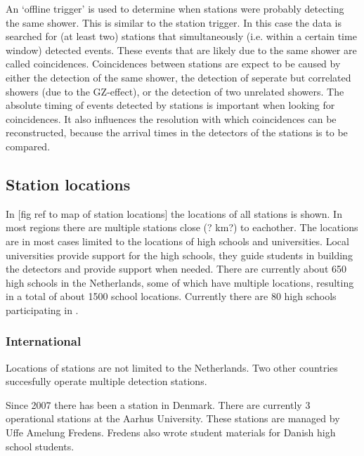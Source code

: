 An `offline trigger' is used to determine when stations were probably detecting the same shower. This is similar to the station trigger. In this case the data is searched for (at least two) stations that simultaneously (i.e. within a certain time window) detected events. These events that are likely due to the same shower are called coincidences. Coincidences between stations are expect to be caused by either the detection of the same shower, the detection of seperate but correlated showers (due to the GZ-effect), or the detection of two unrelated showers. The absolute timing of events detected by stations is important when looking for coincidences. It also influences the resolution with which coincidences can be reconstructed, because the arrival times in the detectors of the stations is to be compared.

\subsection{Station locations}

In [fig ref to map of station locations] the locations of all \hisparc stations is shown. In most regions there are multiple stations close (? km?) to eachother. The locations are in most cases limited to the locations of high schools and universities. Local universities provide support for the high schools, they guide students in building the detectors and provide support when needed. There are currently about \num{650} high schools in the Netherlands, some of which have multiple locations, resulting in a total of about \num{1500} school locations. Currently there are \num{80} high schools participating in \hisparc.

\subsubsection{International}

Locations of \hisparc stations are not limited to the Netherlands. Two other countries succesfully operate multiple detection stations.

Since 2007 there has been a \hisparc station in Denmark. There are currently 3 operational stations at the Aarhus University. These stations are managed by Uffe Amelung Fredens. Fredens also wrote student materials for Danish high school students.

